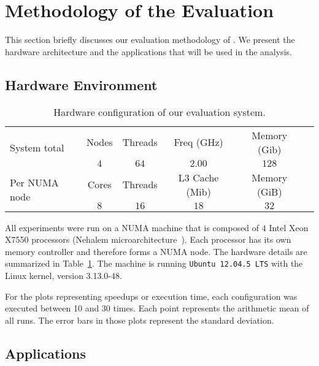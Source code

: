 
\section{Methodology of the Evaluation}
\label{sec:metho}

This section briefly discusses our evaluation methodology of \TABARNAC.
We present the hardware architecture and the applications that will be used in the analysis.

\subsection{Hardware Environment}
\label{sec:expe-setup}

\begin{table}[!b]
    \centering
    \caption{Hardware configuration of our evaluation system.}
    \label{tab:turing}
    \footnotesize
        \begin{tabular}{lccccc}
            \toprule
            \multirow{2}{1.5cm}{System total} & Nodes & Threads & Freq (GHz) & Memory (Gib) \\
            \cmidrule(lr){2-5}
                & $4$   & $64$ & $2.00$ & $128$ \\
            \midrule
           \multirow{2}{1.5cm}{\vspace{2mm}Per NUMA node} & Cores & Threads & L3 Cache (Mib) & Memory (GiB) \\
           \cmidrule(lr){2-5}
            & $8$ & $16$ & $18$ & $32$  \\
            \bottomrule
        \end{tabular}

\end{table}

All experiments were run on a NUMA machine that is composed of $4$ Intel Xeon X7550
processors (Nehalem microarchitecture~\cite{Intel2010}). Each processor has its own memory controller and therefore forms a NUMA node. The hardware details are summarized in Table~\ref{tab:turing}.
The machine is running \texttt{Ubuntu 12.04.5 LTS} with the Linux kernel, version 3.13.0-48.

For the plots representing speedups or execution time, each configuration was executed between 10 and 30
times. Each point represents the arithmetic mean of all runs.
The error bars in those plots represent the standard deviation.

\subsection{Applications}

